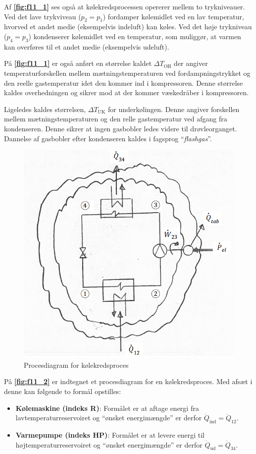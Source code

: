 Af \textbf{\autoref{fig:f11_1}} ses også at kølekredsprocessen opererer mellem to trykniveauer. Ved det lave trykviveau ($p_2 = p_1$) fordamper kølemidlet ved en lav temperatur, hvorved et andet medie (eksempelvis indeluft) kan køles. Ved det høje trykniveau ($p_4=p_3$) kondenserer kølemidlet ved en temperatur, som muliggør, at varmen kan overføres til et andet medie (eksempelvis udeluft).

På \textbf{\autoref{fig:f11_1}} er også anført en størrelse kaldet $\Delta T_{\mathrm{OH}}$ der angiver temperaturforskellen mellem mætningstemperaturen ved fordampningstrykket og den reelle gastemperatur idet den kommer ind i kompressoren. Denne størrelse kaldes overhedningen og sikrer mod at der kommer væskedråber i kompressoren.

Ligeledes kaldes størrelsen, $\Delta T_{\mathrm{UK}}$ for underkølingen. Denne angiver forskellen mellem mætningstemperaturen og den relle gastemperatur ved afgang fra kondenseren. Denne sikrer at ingen gasbobler ledes videre til drøvleorganget. Dannelse af gasbobler efter kondenseren kaldes i fagsprog ``\textit{flashgas}''.

\begin{figure} [ht]
  \centering
  \includegraphics[width=0.4\linewidth]{./figures/f11_2.png}
  \caption{Procesdiagram for kølekredsproces}
  \label{fig:f11_2}
\end{figure}

På \textbf{\autoref{fig:f11_2}} er indtegnet et procesdiagram for en kølekredsproces. Med afsæt i denne kan følgende to formål opstilles:
\begin{itemize}
  \item \textbf{Kølemaskine (indeks R)}: Formålet er at aftage energi fra lavtemperaturreservoiret og ``ønsket energimængde'' er derfor $\dot{Q}_{\mathrm{ind}}=\dot{Q}_{12}$.
  \item \textbf{Varmepumpe (indeks HP)}: Formålet er at levere energi til højtemperaturreservoiret og ``ønsket energimængde'' er derfor $\dot{Q}_{\mathrm{ud}}=\dot{Q}_{34}$.
\end{itemize}

